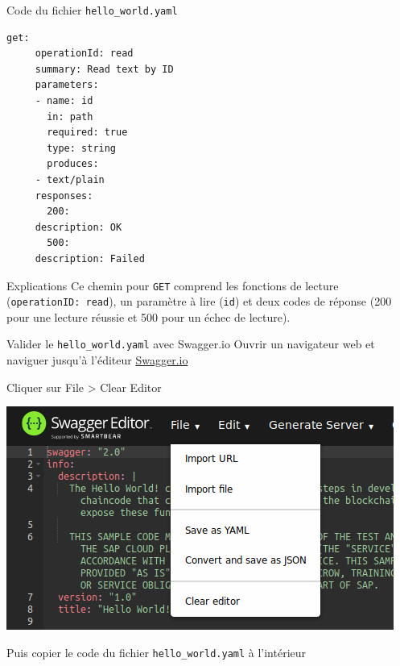 \documentclass[presentation]{beamer}
\begin{document}
\begin{frame}[fragile,label={sec:orgb8e01f0}]{Code du fichier \texttt{hello\_world.yaml}}
 \begin{verbatim}
get:
     operationId: read
     summary: Read text by ID
     parameters:
     - name: id
       in: path
       required: true
       type: string
       produces:
     - text/plain
     responses:
       200:
	 description: OK
       500:
	 description: Failed
\end{verbatim}
\end{frame}
\begin{frame}[fragile,label={sec:org265b656}]{Explications}
 Ce chemin pour \texttt{GET} comprend les fonctions de lecture (\texttt{operationID: read}), 
un paramètre à lire (\texttt{id}) et deux codes de réponse (200 pour une lecture 
réussie et 500 pour un échec de lecture).
\end{frame}
\begin{frame}[fragile,label={sec:org07c3483}]{Valider le \texttt{hello\_world.yaml} avec Swagger.io}
 Ouvrir un navigateur web et naviguer jusqu'à l'éditeur \href{https://editor.swagger.io/}{Swagger.io}

Cliquer sur File > Clear Editor

\begin{center}
\includegraphics[width=.9\linewidth]{./swagger_file_clear.png}
\end{center}

Puis copier le code du fichier \texttt{hello\_world.yaml} à l'intérieur
\end{frame}
\end{document}
